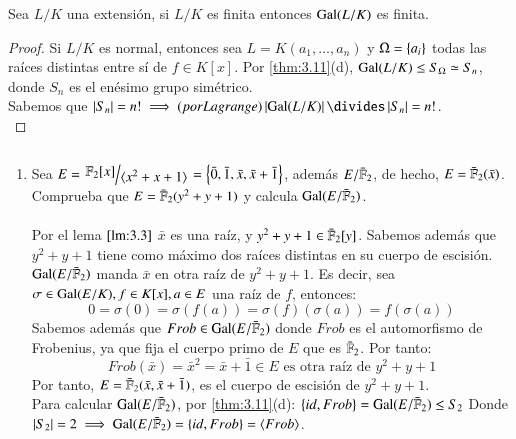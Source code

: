 \begin{pro}\label{pro:ext-gal-finit}
    Sea $L/K$ una extensión, si $L/K$ es finita entonces $\mathrm{Gal}(L/K)$ es finita.
\end{pro}

\begin{proof}
    Si $L/K$ es normal, entonces sea $L = K(a_1, \ldots, a_n)$ y $\Omega = \left\{a_i\right\}$ todas las raíces distintas entre sí de $f \in K[x]$. Por \ref{thm:3.11}(d), $\mathrm{Gal}(L/K) \leq S_\Omega \simeq S_n$, donde $S_n$ es el enésimo grupo simétrico.\\
    Sabemos que $\vabs{S_n} = n! \implies \text(por Lagrange) \vabs{\gal(L/K)} \divides \vabs{S_n} = n!$.\\
\end{proof}

\begin{eg}$ $
    \begin{enumerate}
        \item Sea $E = \quo{\F_2[x]}{\gen{x^2 + x + 1}} = \sdf{\bar 0, \bar 1, \bar x, \bar x + \bar 1}$, además $E/\bar {\mathbb{F}}_2$, de hecho, $E = \bar {\mathbb{F}}_2(\bar x)$. Comprueba que $E = \bar{\mathbb{F}}_2(y^2 + y + 1)$ y calcula $\mathrm{Gal}(E/\bar {\mathbb{F}}_2)$.\\\\

        Por el lema $\ref{lm:3.3}$ $\bar x$ es una raíz, y $y^2 + y + 1 \in \bar{\mathbb{F}}_2[y]$. Sabemos además que $y^2 + y + 1$ tiene como máximo dos raíces distintas en su cuerpo de escisión.\\
        $\mathrm{Gal}(E/\bar{\mathbb{F}}_2)$ manda $\bar x$ en otra raíz de $y^2 + y + 1$. Es decir, sea $\sigma \in \mathrm{Gal}(E/K), f\in K[x], a\in E$ una raíz de $f$, entonces:
        $$
            0 = \sigma(0) = \sigma(f(a)) = \sigma(f)(\sigma(a)) = f(\sigma(a))
        $$
        Sabemos además que $Frob \in \mathrm{Gal}(E/\bar {\mathbb{F}}_2)$ donde $Frob$ es el automorfismo de Frobenius, ya que fija el cuerpo primo de $E$ que es $\bar {\mathbb{F}}_2$. Por tanto:
        $$
            Frob(\bar x) = \bar x^2 = \bar x + \bar 1 \in E \text{ es otra raíz de } y^2 + y + 1
        $$
        Por tanto, $E = \bar {\mathbb{F}}_2(\bar x, \bar x + \bar 1)$, es el cuerpo de escisión de $y^2 + y + 1$.\\

        Para calcular $\mathrm{Gal}(E/\bar {\mathbb{F}}_2)$, por \ref{thm:3.11}(d): $\left\{id, Frob\right\} = \mathrm{Gal}(E/\bar {\mathbb{F}}_2) \leq S_2$ Donde $\left|S_2\right| = 2 \implies \mathrm{Gal}(E/\bar {\mathbb{F}}_2) = \left\{id, Frob\right\} = \langle Frob\rangle$.


\end{enumerate}
\end{eg}
